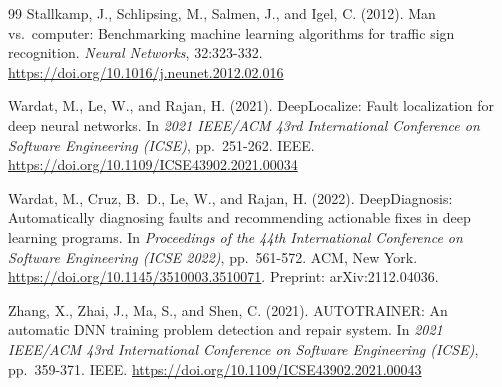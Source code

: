 \begin{thebibliography}{99}
Stallkamp, J., Schlipsing, M., Salmen, J., and Igel, C. (2012).
\newblock Man vs.\ computer: Benchmarking machine learning algorithms for traffic sign recognition.
\newblock \emph{Neural Networks}, 32:323-332.
\newblock \url{https://doi.org/10.1016/j.neunet.2012.02.016}

Wardat, M., Le, W., and Rajan, H. (2021).
\newblock DeepLocalize: Fault localization for deep neural networks.
\newblock In \emph{2021 IEEE/ACM 43rd International Conference on Software Engineering (ICSE)}, pp.~251-262. IEEE.
\newblock \url{https://doi.org/10.1109/ICSE43902.2021.00034}

Wardat, M., Cruz, B.~D., Le, W., and Rajan, H. (2022).
\newblock DeepDiagnosis: Automatically diagnosing faults and recommending actionable fixes in deep learning programs.
\newblock In \emph{Proceedings of the 44th International Conference on Software Engineering (ICSE 2022)}, pp.~561-572. ACM, New York.
\newblock \url{https://doi.org/10.1145/3510003.3510071}. Preprint: arXiv:2112.04036.

Zhang, X., Zhai, J., Ma, S., and Shen, C. (2021).
\newblock AUTOTRAINER: An automatic DNN training problem detection and repair system.
\newblock In \emph{2021 IEEE/ACM 43rd International Conference on Software Engineering (ICSE)}, pp.~359-371. IEEE.
\newblock \url{https://doi.org/10.1109/ICSE43902.2021.00043}

\end{thebibliography}
